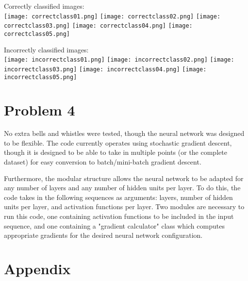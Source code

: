 \documentclass{report}
\begin{document}
Correctly classified images:\\
\texttt{[image: correctclass01.png]}
\texttt{[image: correctclass02.png]}
\texttt{[image: correctclass03.png]}
\texttt{[image: correctclass04.png]}
\texttt{[image: correctclass05.png]}

Incorrectly classified images:\\
\texttt{[image: incorrectclass01.png]}
\texttt{[image: incorrectclass02.png]}
\texttt{[image: incorrectclass03.png]}
\texttt{[image: incorrectclass04.png]}
\texttt{[image: incorrectclass05.png]}



\newpage
\section*{Problem 4}

No extra bells and whistles were tested, though the neural network was designed to be flexible.
The code currently operates using stochastic gradient descent, though it is designed to be able to take in multiple points (or the complete dataset) for easy conversion to batch/mini-batch gradient descent.

Furthermore, the modular structure allows the neural network to be adapted for any number of layers and any number of hidden units per layer. 
To do this, the code takes in the following sequences as arguments: layers, number of hidden units per layer, and activation functions per layer. 
Two modules are necessary to run this code, one containing activation functions to be included in the input sequence, and one containing a "gradient calculator" class which computes appropriate gradients for the desired neural network configuration.



\newpage
\section*{Appendix}



\newpage


\-\\
\-\\
\-\\
\-\\

\end{document}

